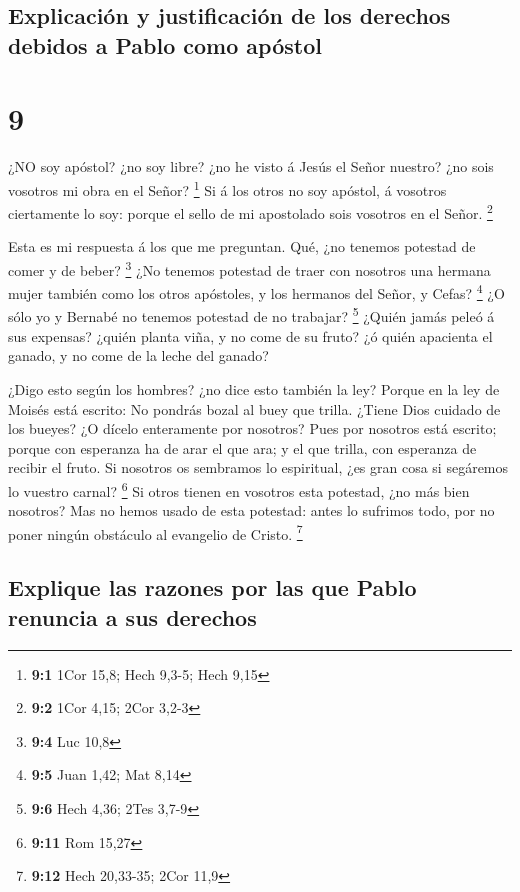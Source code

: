 \hypertarget{explicaciuxf3n-y-justificaciuxf3n-de-los-derechos-debidos-a-pablo-como-apuxf3stol}{%
\subsection{Explicación y justificación de los derechos debidos a Pablo
como
apóstol}\label{explicaciuxf3n-y-justificaciuxf3n-de-los-derechos-debidos-a-pablo-como-apuxf3stol}}

\hypertarget{section-8}{%
\section{9}\label{section-8}}

 ¿NO soy apóstol? ¿no soy libre? ¿no he visto á Jesús el
Señor nuestro? ¿no sois vosotros mi obra en el Señor? \footnote{\textbf{9:1}
  1Cor 15,8; Hech 9,3-5; Hech 9,15}  Si á los otros no soy
apóstol, á vosotros ciertamente lo soy: porque el sello de mi apostolado
sois vosotros en el Señor. \footnote{\textbf{9:2} 1Cor 4,15; 2Cor 3,2-3}

 Esta es mi respuesta á los que me preguntan. 
Qué, ¿no tenemos potestad de comer y de beber? \footnote{\textbf{9:4}
  Luc 10,8}  ¿No tenemos potestad de traer con nosotros una
hermana mujer también como los otros apóstoles, y los hermanos del
Señor, y Cefas? \footnote{\textbf{9:5} Juan 1,42; Mat 8,14} 
¿O sólo yo y Bernabé no tenemos potestad de no trabajar? \footnote{\textbf{9:6}
  Hech 4,36; 2Tes 3,7-9}  ¿Quién jamás peleó á sus expensas?
¿quién planta viña, y no come de su fruto? ¿ó quién apacienta el ganado,
y no come de la leche del ganado?

 ¿Digo esto según los hombres? ¿no dice esto también la ley?
 Porque en la ley de Moisés está escrito: No pondrás bozal
al buey que trilla. ¿Tiene Dios cuidado de los bueyes?  ¿O
dícelo enteramente por nosotros? Pues por nosotros está escrito; porque
con esperanza ha de arar el que ara; y el que trilla, con esperanza de
recibir el fruto.  Si nosotros os sembramos lo espiritual,
¿es gran cosa si segáremos lo vuestro carnal? \footnote{\textbf{9:11}
  Rom 15,27}  Si otros tienen en vosotros esta potestad,
¿no más bien nosotros? Mas no hemos usado de esta potestad: antes lo
sufrimos todo, por no poner ningún obstáculo al evangelio de Cristo.
\footnote{\textbf{9:12} Hech 20,33-35; 2Cor 11,9}

\hypertarget{explique-las-razones-por-las-que-pablo-renuncia-a-sus-derechos}{%
\subsection{Explique las razones por las que Pablo renuncia a sus
derechos}\label{explique-las-razones-por-las-que-pablo-renuncia-a-sus-derechos}}

